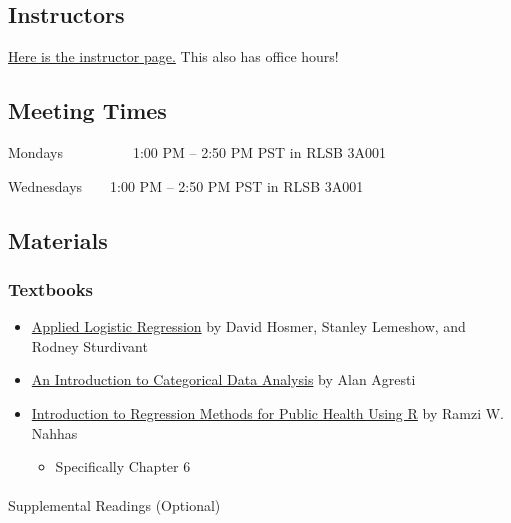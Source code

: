 \documentclass[
  letterpaper,
  DIV=11,
  numbers=noendperiod]{scrartcl}
\makeatletter
\let\oldparagraph\paragraph
\renewcommand{\paragraph}{
    \@ifstar
      \xxxParagraphStar
      \xxxParagraphNoStar
  }
\newcommand{\xxxParagraphStar}[1]{\oldparagraph*{#1}\mbox{}}
\newcommand{\xxxParagraphNoStar}[1]{\oldparagraph{#1}\mbox{}}
\providecommand{\tightlist}{%
  \setlength{\itemsep}{0pt}\setlength{\parskip}{0pt}}\usepackage{longtable,booktabs,array}
\makeatother
\begin{document}
\subsection{Instructors}\label{instructors}

\href{instructors.qmd}{Here is the instructor page.} This also has
office hours!

\subsection{Meeting Times}\label{meeting-times}

Mondays~~~~~~~~~~1:00 PM -- 2:50 PM PST in RLSB 3A001

Wednesdays~~~~1:00 PM -- 2:50 PM PST in RLSB 3A001

\subsection{Materials}\label{materials}

\subsubsection{Textbooks}\label{textbooks}

\begin{itemize}
\item
  \href{https://ohsuitg-my.sharepoint.com/:b:/r/personal/wakim_ohsu_edu/Documents/Teaching/Classes/S2024_BSTA_513_613/Student_files/Textbooks/Hosmer_Applied_Logistic_Regression.pdf?csf=1&web=1&e=Ur29qk}{Applied
  Logistic Regression} by David Hosmer, Stanley Lemeshow, and Rodney
  Sturdivant
\item
  \href{https://ohsuitg-my.sharepoint.com/:b:/r/personal/wakim_ohsu_edu/Documents/Teaching/Classes/S2024_BSTA_513_613/Student_files/Textbooks/Agresti_Introduction_to_Categorical_Data.pdf?csf=1&web=1&e=WBwuuW}{An
  Introduction to Categorical Data Analysis} by Alan Agresti
\item
  \href{https://bookdown.org/rwnahhas/RMPH/}{Introduction to Regression
  Methods for Public Health Using R} by Ramzi W. Nahhas

  \begin{itemize}
  \tightlist
  \item
    Specifically Chapter 6
  \end{itemize}
\end{itemize}

\paragraph{Supplemental Readings
(Optional)}\label{supplemental-readings-optional}
\end{document}

